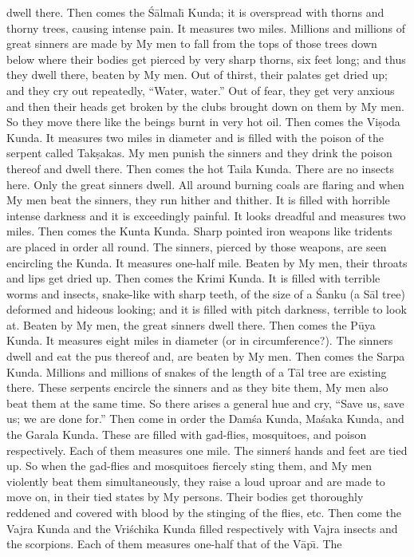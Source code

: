 dwell there. Then comes the \'S\=almal\={\i} Kunda; it is overspread with thorns and thorny trees, causing intense pain. It measures two miles. Millions and millions of great sinners are made by My men to fall from the tops of those trees down below where their bodies get pierced by very sharp thorns, six feet long; and thus they dwell there, beaten by My men. Out of thirst, their palates get dried up; and they cry out repeatedly, ``Water, water.'' Out of fear, they get very anxious and then their heads get broken by the clubs brought down on them by My men. So they move there like the beings burnt in very hot oil. Then comes the Vi\d{s}oda Kunda. It measures two miles in diameter and is filled with the poison of the serpent called Tak\d{s}akas. My men punish the sinners and they drink the poison thereof and dwell there. Then comes the hot Taila Kunda. There are no insects here. Only the great sinners dwell. All around burning coals are flaring and when My men beat the sinners, they run hither and thither. It is filled with horrible intense darkness and it is exceedingly painful. It looks dreadful and measures two miles. Then comes the Kunta Kunda. Sharp pointed iron weapons like tridents are placed in order all round. The sinners, pierced by those weapons, are seen encircling the Kunda. It measures one-half mile. Beaten by My men, their throats and lips get dried up. Then comes the Krimi Kunda. It is filled with terrible worms and insects, snake-like with sharp teeth, of the size of a \'Sanku (a S\=al tree) deformed and hideous looking; and it is filled with pitch darkness, terrible to look at. Beaten by My men, the great sinners dwell there. Then comes the P\=uya Kunda. It measures eight miles in diameter (or in circumference?). The sinners dwell and eat the pus thereof and, are beaten by My men. Then comes the Sarpa Kunda. Millions and millions of snakes of the length of a T\=al tree are existing there. These serpents encircle the sinners and as they bite them, My men also beat them at the same time. So there arises a general hue and cry, ``Save us, save us; we are done for.'' Then come in order the Dam\'sa Kunda, Ma\'saka Kunda, and the Garala Kunda. These are filled with gad-flies, mosquitoes, and poison respectively. Each of them measures one mile. The sinner\'s hands and feet are tied up. So when the gad-flies and mosquitoes fiercely sting them, and My men violently beat them simultaneously, they raise a loud uproar and are made to move on, in their tied states by My persons. Their bodies get thoroughly reddened and covered with blood by the stinging of the flies, etc. Then come the Vajra Kunda and the Vri\'schika Kunda filled respectively with Vajra insects and the scorpions. Each of them measures one-half that of the V\=ap\={\i}. The


